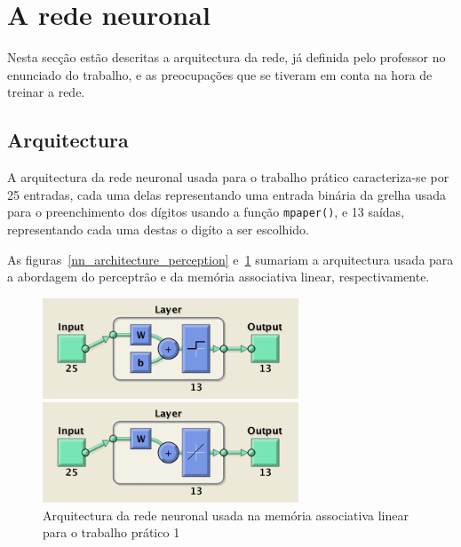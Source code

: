 \documentclass{article}
\begin{document}
\clearpage

\section{A rede neuronal}
Nesta secção estão descritas a arquitectura da rede, já definida pelo professor no enunciado do trabalho, e as preocupações que se tiveram em conta na hora de treinar a rede.

\subsection{Arquitectura}
A arquitectura da rede neuronal usada para o trabalho prático caracteriza-se por 25 entradas, cada uma delas representando uma entrada binária da grelha usada para o preenchimento dos dígitos usando a função \texttt{mpaper()}, e 13 saídas, representando cada uma destas o digíto a ser escolhido.

As figuras~\ref{nn_architecture_perception} e~\ref{nn_architecture_lam} sumariam a arquitectura usada para a abordagem do perceptrão e da memória associativa linear, respectivamente.

\begin{figure}[!h]
  \centering
  \includegraphics[width=3in]{figures/nn_architecture_perception}
  \caption{Arquitectura da rede neuronal usada no perceptrão para o trabalho prático 1}
  \label{nn_architecture_perception}
  
  \includegraphics[width=3in]{figures/nn_architecture_lam}
  \caption{Arquitectura da rede neuronal usada na memória associativa linear para o trabalho prático 1}
  \label{nn_architecture_lam}
\end{figure}
\end{document}
